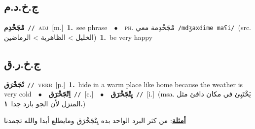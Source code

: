 \documentclass[10pt,a4paper,twoside]{article} %
\begin{document}
\begin{multicols}{2}
\vspace{-3mm}
\subsection*{\color{blue}\foreignlanguage{arabic}{ج.خ.د.م}\color{blue}{}} 

{\setlength\topsep{0pt}\textbf{\foreignlanguage{arabic}{مْجَخْدِم}}\ {\color{gray}\texttt{//}\color{black}}\ \textsc{adj}\ [m.]\ \textbf{1.}~see phrase\ \ $\bullet$\ \ \textsc{ph.} \color{gray} \foreignlanguage{arabic}{مْجَخْدِمة معي}\color{black}\ {\color{gray}\texttt{/{\sffamily mdʒaxdime maʕi}/}\color{black}}\ \color{gray}(src. \foreignlanguage{arabic}{الخليل > الظاهرية > الرماضين})\color{black}\ \textbf{1.}~be very happy\ } \vspace{2mm}

\vspace{-3mm}
\subsection*{\color{blue}\foreignlanguage{arabic}{ج.خ.ر.ق}\color{blue}{}} 

{\setlength\topsep{0pt}\textbf{\foreignlanguage{arabic}{تْجَخْرَق}}\ {\color{gray}\texttt{//}\color{black}}\ \textsc{verb}\ [p.]\ \textbf{1.}~hide in a warm place like home because the weather is very cold\ \ $\bullet$\ \ \setlength\topsep{0pt}\textbf{\foreignlanguage{arabic}{اِتْجَخْرَق}}\ {\color{gray}\texttt{//}\color{black}}\ [c.]\ \ $\bullet$\ \ \setlength\topsep{0pt}\textbf{\foreignlanguage{arabic}{يِتْجَخْرَق}}\ {\color{gray}\texttt{//}\color{black}}\ [i.]\ \color{gray}(msa. \foreignlanguage{arabic}{يَخْتَبِئ في مكان دافئ مثل المنزل لأن الجو بارد جدا}~\foreignlanguage{arabic}{\textbf{١.}})\color{black}\  \begin{flushright}\color{gray}\foreignlanguage{arabic}{\textbf{\underline{\foreignlanguage{arabic}{أمثلة}}}: من كثر البرد الواحد بده يِتْجَخْرَق ومايطلع أبدا والله تجمدنا}\end{flushright}\color{black}} \vspace{2mm}


\end{multicols}
\end{document}
